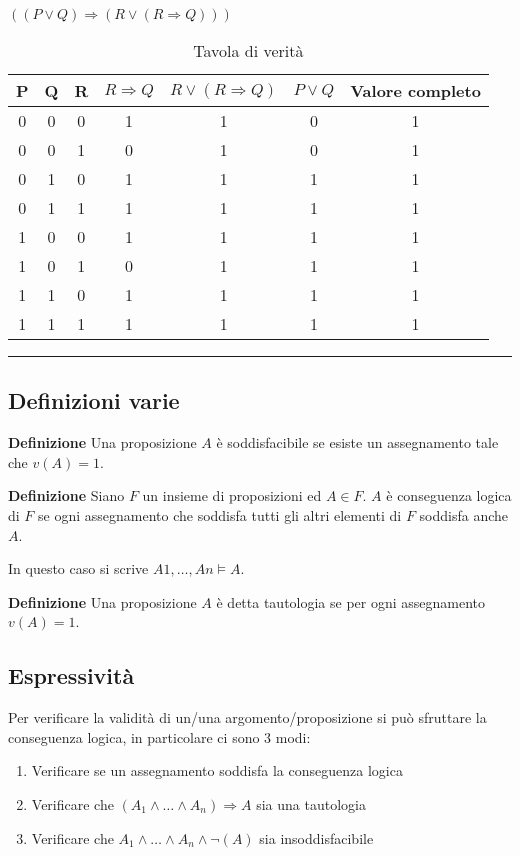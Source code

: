 \documentclass{article}
\begin{document}
\noindent $((P\lor Q)\Rightarrow(R\lor(R\Rightarrow Q)))$

\begin{table}[ht]
    \centering
    \begin{tabular}{ccc|c|c|c|c}
        P & Q & R & $R\Rightarrow Q$ & $R\lor(R\Rightarrow Q)$& $P\lor Q$ & Valore completo\\
        \hline
        0 & 0 & 0 & 1 & 1 & 0 & 1\\
        0 & 0 & 1 & 0 & 1 & 0 & 1\\
        0 & 1 & 0 & 1 & 1 & 1 & 1\\
        0 & 1 & 1 & 1 & 1 & 1 & 1\\
        1 & 0 & 0 & 1 & 1 & 1 & 1\\
        1 & 0 & 1 & 0 & 1 & 1 & 1\\
        1 & 1 & 0 & 1 & 1 & 1 & 1\\
        1 & 1 & 1 & 1 & 1 & 1 & 1\\
    \end{tabular}
    \caption{Tavola di verità}
    \label{tab:true_table}
\end{table}

\noindent\rule{\textwidth}{0.5pt}\newline

\subsection{Definizioni varie}

\textbf{Definizione} Una proposizione $A$ è soddisfacibile se esiste un assegnamento tale che $v(A)=1$.\newline

\noindent \textbf{Definizione} Siano $F$ un insieme di proposizioni ed $A\in F$. $A$ è conseguenza logica di $F$ se ogni assegnamento che soddisfa tutti gli altri elementi di $F$ soddisfa anche $A$.\newline

\noindent In questo caso si scrive $A1,\ldots, An \models A$.\newline

\noindent \textbf{Definizione} Una proposizione $A$ è detta tautologia se per ogni assegnamento $v(A)=1$.

\subsection{Espressività}

Per verificare la validità di un/una argomento/proposizione si può sfruttare la conseguenza logica, in particolare ci sono 3 modi:
\begin{enumerate}
    \item Verificare se un assegnamento soddisfa la conseguenza logica
    \item Verificare che $(A_1\land \ldots \land A_n) \Rightarrow A$ sia una tautologia
    \item Verificare che $A_1\land \ldots \land A_n \land \neg(A)$ sia insoddisfacibile
\end{enumerate}
\end{document}
